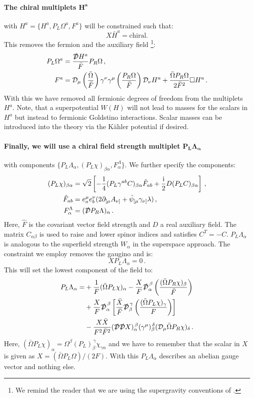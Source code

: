 \documentclass[a4paper,12pt,twoside,openright]{report}
\newcommand{\be}{\begin{equation}}
\newcommand{\ee}{\end{equation}}
\newcommand{\bea}{\begin{equation}\begin{aligned}}
\newcommand{\eea}{\end{aligned}\end{equation}}
\def\rmi{{\rm i}}
\begin{document}
\paragraph{The chiral multiplets $\mathbf{H^a}$} with $H^a =\{H^a,P_L \Omega^a,F^a\}$ will be constrained such that:
\be 
X\bar{H}^a = \text{chiral.}
\ee
This removes the fermion and the auxiliary field \cite{Komargodski:2009rz}\footnote{We remind the reader that we are using the supergravity conventions of \cite{Freedman:2012zz}.}:
\bea
P_L\Omega^a &= \frac{\slashed{\mathcal{D}} H^a}{\bar{F}} P_R \Omega\,,\\
F^a &= \mathcal{D}_\mu \left(\frac{\bar{\Omega}}{\bar{F}}\right) \gamma^\nu \gamma^\mu \left(\frac{P_R\Omega}{\bar{F}} \right)\mathcal{D}_\nu H^a + \frac{\bar{\Omega}P_R\Omega}{2\bar{F}^2} \square H^a\,.
\eea
With this we have removed all fermionic degrees of freedom from the multiplets $H^a$. Note, that a superpotential $W(H)$ will not lead to masses for the scalars in $H^a$ but instead to fermionic Goldstino interactions. Scalar masses can be introduced into the theory via the Kähler potential if desired.
\paragraph{Finally, we will use a chiral field strength multiplet $\mathbf{P_L \Lambda_\alpha}$} with components $\{P_L \Lambda_\alpha,(P_L\chi)_{\beta\alpha},F^\Lambda_\alpha\}$. We further specify the components:
\bea 
(P_L\chi)_{\beta\alpha} &= \sqrt{2}\left[-\frac{1}{4} (P_L \gamma^{ab} C)_{\beta \alpha}\hat{F}_{ab} + \frac{\rmi}{2} D(P_LC)_{\beta\alpha}\right]\,,\\
\hat{F}_{ab} &= e^\mu_a e^\nu_b (2 \partial_{[\mu} A_{\nu]} + \bar{\psi}_{[\mu}\gamma_{\nu]}\lambda)\,,\\
F_\alpha^\Lambda &= (\slashed{\mathcal{D}}P_R \Lambda)_\alpha\,.
\label{eq:fieldstrencomp}
\eea
Here, $\hat{F}$ is the covariant vector field strength and $D$ a real auxiliary field. The matrix $C_{\alpha\beta}$ is used to raise and lower spinor indices and satisfies $C^T = -C$. $P_L \Lambda_\alpha$ is analogous to the superfield strength $W_\alpha $ in the superspace approach. The constraint we employ removes the gaugino and is:
\be 
X P_L \Lambda_\alpha = 0\,.
\label{eq:fermconst}
\ee
This will set the lowest component of the field to:
\bea
P_L \Lambda_\alpha = &+\frac{1}{F} (\bar{\Omega}P_L\chi)_\alpha - \frac{X}{F} \slashed{\mathcal{D}}_\alpha^{\,\beta} \left(\frac{(\bar{\Omega} P_R\chi)_\beta}{\bar{F}}\right)\\
&+\frac{X}{F}\slashed{\mathcal{D}}_\alpha^{\,\beta} \left[ \frac{\bar{X}}{\bar{F}} \slashed{\mathcal{D}}_\beta^{\,\gamma} \left(\frac{(\bar{\Omega}P_L\chi)_\gamma}{F}\right)\right]\\
&-\frac{X\bar{X}}{F^2\bar{F}^2} (\slashed{\mathcal{D}}\slashed{\mathcal{D}}X)_\alpha^{\,\beta} (\gamma^\mu)_\beta^{\,\delta}(\mathcal{D}_\mu\bar{\Omega}P_R\chi)_\delta\,.
\eea
Here, $(\bar{\Omega}P_L\chi)_\alpha = \Omega^\beta(P_L)_\beta^{\,\gamma} \chi_{\gamma\alpha}$ and we have to remember that  the scalar in $X$ is given as $X = (\bar{\Omega} P_L \Omega)/(2F)$. With this $P_L \Lambda_\alpha$ describes an abelian gauge vector and nothing else.
\end{document}
